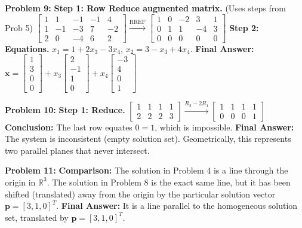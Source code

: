 \documentclass[12pt]{article}
\begin{document}
\textbf{Problem 9:}
\textbf{Step 1: Row Reduce augmented matrix.} (Uses steps from Prob 5)
$\begin{bmatrix} 1 & 1 & -1 & -1 & 4 \\ 1 & -1 & -3 & 7 & -2 \\ 2 & 0 & -4 & 6 & 2 \end{bmatrix} \xrightarrow{\text{RREF}} \begin{bmatrix} 1 & 0 & -2 & 3 & 1 \\ 0 & 1 & 1 & -4 & 3 \\ 0 & 0 & 0 & 0 & 0 \end{bmatrix}$
\textbf{Step 2: Equations.}
$x_1 = 1 + 2x_3 - 3x_4$, $x_2 = 3 - x_3 + 4x_4$.
\textbf{Final Answer:} $\mathbf{x} = \begin{bmatrix} 1 \\ 3 \\ 0 \\ 0 \end{bmatrix} + x_3 \begin{bmatrix} 2 \\ -1 \\ 1 \\ 0 \end{bmatrix} + x_4 \begin{bmatrix} -3 \\ 4 \\ 0 \\ 1 \end{bmatrix}$

\textbf{Problem 10:}
\textbf{Step 1: Reduce.}
$\begin{bmatrix} 1 & 1 & 1 & 1 \\ 2 & 2 & 2 & 3 \end{bmatrix} \xrightarrow{R_2 - 2R_1} \begin{bmatrix} 1 & 1 & 1 & 1 \\ 0 & 0 & 0 & 1 \end{bmatrix}$
\textbf{Conclusion:} The last row equates $0 = 1$, which is impossible.
\textbf{Final Answer:} The system is inconsistent (empty solution set). Geometrically, this represents two parallel planes that never intersect.

\textbf{Problem 11:}
\textbf{Comparison:} The solution in Problem 4 is a line through the origin in $\mathbb{R}^3$. The solution in Problem 8 is the exact same line, but it has been shifted (translated) away from the origin by the particular solution vector $\mathbf{p} = [3, 1, 0]^T$.
\textbf{Final Answer:} It is a line parallel to the homogeneous solution set, translated by $\mathbf{p} = [3, 1, 0]^T$.
\end{document}
